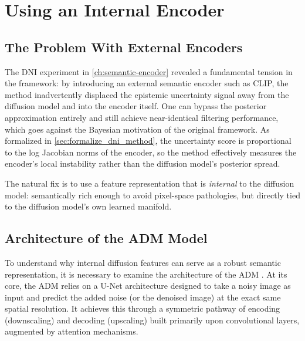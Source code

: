 \chapter{Using an Internal Encoder}
\label{ch:using_internal_encoder}


\section{The Problem With External Encoders}

The \acs{DNI} experiment in \autoref{ch:semantic-encoder} revealed a fundamental
tension in the \citeauthor{jazbec_generative_2025} framework: by introducing an external
semantic encoder such as \acs{CLIP}, the method inadvertently displaced the epistemic
uncertainty signal away from the diffusion model and into the encoder itself. One can
bypass the posterior approximation entirely and still achieve near-identical filtering
performance, which goes
against the Bayesian motivation of the original framework. 
As formalized in \autoref{sec:formalize_dni_method}, 
the uncertainty score is proportional to the log Jacobian norms of the encoder, so the method effectively measures the encoder's local instability
rather than the diffusion model's posterior spread.

The natural fix is to use a feature representation that is \emph{internal} to the
diffusion model: semantically rich enough to avoid pixel-space pathologies, but directly
tied to the diffusion model's own learned manifold.

\section{Architecture of the ADM Model}
\label{sec:adm-architecture}

To understand why internal diffusion features can serve as a robust semantic representation, it is necessary to examine the architecture of the \acs{ADM} \parencite{dhariwal_diffusion_2021}. At its core, the \acs{ADM} relies on a U-Net architecture designed to take a noisy image as input and predict the added noise (or the denoised image) at the exact same spatial resolution. It achieves this through a symmetric pathway of encoding (downscaling) and decoding (upscaling) built primarily upon convolutional layers, augmented by attention mechanisms.

